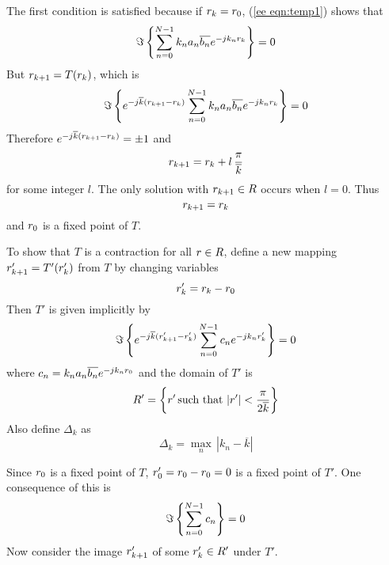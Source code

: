 The first condition is satisfied because if ${r}_k={r}_0$, 
(\ref{ee eqn:temp1}) shows that 
\begin{equation}
\Im\left\{\sum_{n=0}^{N-1} k_na_n\overline{b_n}{e^{-jk_n{r}_k}}\right\}=0
\end{equation}
But ${r}_{k+1}=T({r}_k)$, which is
\begin{equation}
\Im\left\{{e^{-j\overline{k}({r}_{k+1}-{r}_k)}}
\sum_{n=0}^{N-1} k_na_n\overline{b_n}{e^{-jk_n{r}_k}}\right\}=0
\end{equation}
Therefore ${e^{-j\overline{k}({r}_{k+1}-{r}_k)}}=\pm 1$ and
\begin{equation}
{r}_{k+1}={r}_k+l\,\frac{\pi}{\overline{k}}
\end{equation}
for some integer $l$.  The only solution with ${r}_{k+1}\in R$ occurs when
$l=0$.  Thus 
\begin{equation}
{r}_{k+1}={r}_k
\end{equation}
and ${r}_0$ is a fixed point of $T$.

To show that $T$ is a contraction for all ${r}\in R$, define a new 
mapping ${r}'_{k+1}=T'({r}'_k)$ from $T$ by changing variables
\begin{equation}
{r}'_k={r}_k-{r}_0
\end{equation}
Then $T'$ is given implicitly by
\begin{equation}\label{ee eqn:T'}
\Im\left\{{e^{-j\overline{k}({r}'_{k+1}-{r}'_k)}}
\sum_{n=0}^{N-1} c_n{e^{-jk_n{r}'_k}}\right\}=0
\end{equation}
where $c_n=k_na_n\overline{b_n}{e^{-jk_n{r}_0}}$ and the domain of $T'$ is
\begin{equation}
R'=\left\{
{r}'\,\mbox{such that}\,\left|{r}'\right|<\frac{\pi}{2\overline{k}}
\right\}
\end{equation}
Also define $\Delta_k$ as
\begin{equation}
\Delta_k=\max_n\,\left|k_n-\overline{k}\right|
\end{equation}

Since ${r}_0$ is a fixed point of $T$, ${r}'_0={r}_0-{r}_0=0$ is a fixed point
of $T'$.  One consequence of this is
\begin{equation}
\Im\left\{\sum_{n=0}^{N-1}c_n\right\}=0
\end{equation}
Now consider the image ${r}'_{k+1}$ of some ${r}'_k\in R'$ under $T'$.

